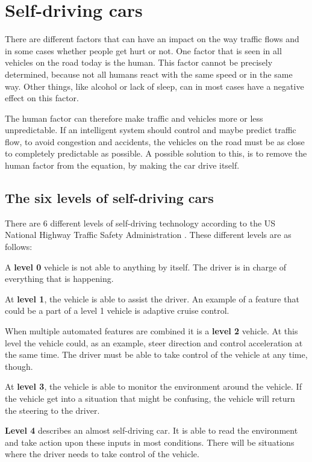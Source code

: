 \section{Self-driving cars}\label{probana:self-drivingCars}
There are different factors that can have an impact on the way traffic flows and in some cases whether people get hurt or not.
One factor that is seen in all vehicles on the road today is the human.
This factor cannot be precisely determined, because not all humans react with the same speed or in the same way.
Other things, like alcohol or lack of sleep, can in most cases have a negative effect on this factor.
\cite{vi.chilukuri.ctrdot.gov_usdot_2017}

The human factor can therefore make traffic and vehicles more or less unpredictable.
If an intelligent system should control and maybe predict traffic flow, to avoid congestion and accidents, the vehicles on the road must be as close to completely predictable as possible.
A possible solution to this, is to remove the human factor from the equation, by making the car drive itself.

\subsection{The six levels of self-driving cars}
There are 6 different levels of self-driving technology according to the US National Highway Traffic Safety Administration \cite{matthew.lynberg.ctrdot.gov_automated_2017}.
These different levels are as follows:

A \textbf{level 0} vehicle is not able to anything by itself.
The driver is in charge of everything that is happening.

At \textbf{level 1}, the vehicle is able to assist the driver.
An example of a feature that could be a part of a level 1 vehicle is adaptive cruise control.

When multiple automated features are combined it is a \textbf{level 2} vehicle.
At this level the vehicle could, as an example, steer direction and control acceleration at the same time.
The driver must be able to take control of the vehicle at any time, though.

At \textbf{level 3}, the vehicle is able to monitor the environment around the vehicle.
If the vehicle get into a situation that might be confusing, the vehicle will return the steering to the driver.

\textbf{Level 4} describes an almost self-driving car.
It is able to read the environment and take action upon these inputs in most conditions.
There will be situations where the driver needs to take control of the vehicle.

